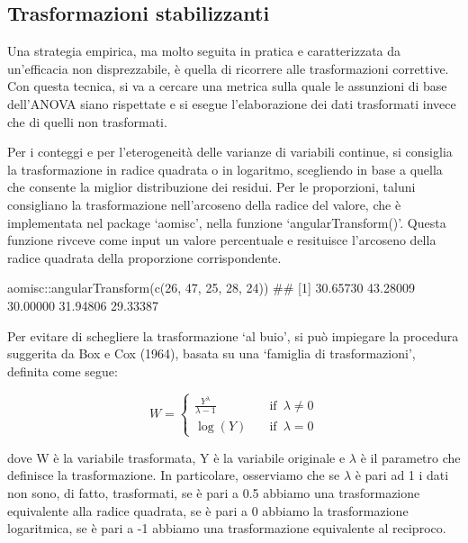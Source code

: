 \documentclass[a4paper,12pt,oneside]{book}
\newenvironment{Shaded}{}{}
\newcommand{\KeywordTok}[1]{#1}
\newcommand{\DecValTok}[1]{#1}
\newcommand{\CommentTok}[1]{#1}
\newcommand{\OperatorTok}[1]{#1}
\newcommand{\NormalTok}[1]{#1}
\begin{document}
\hypertarget{trasformazioni-stabilizzanti}{%
\subsection{Trasformazioni stabilizzanti}\label{trasformazioni-stabilizzanti}}

Una strategia empirica, ma molto seguita in pratica e caratterizzata da un'efficacia non disprezzabile, è quella di ricorrere alle trasformazioni correttive. Con questa tecnica, si va a cercare una metrica sulla quale le assunzioni di base dell'ANOVA siano rispettate e si esegue l'elaborazione dei dati trasformati invece che di quelli non trasformati.

Per i conteggi e per l'eterogeneità delle varianze di variabili continue, si consiglia la trasformazione in radice quadrata o in logaritmo, scegliendo in base a quella che consente la miglior distribuzione dei residui. Per le proporzioni, taluni consigliano la trasformazione nell'arcoseno della radice del valore, che è implementata nel package `aomisc', nella funzione `angularTransform()'. Questa funzione rivceve come input un valore percentuale e resituisce l'arcoseno della radice quadrata della proporzione corrispondente.

\begin{Shaded}
\begin{Highlighting}[]
\NormalTok{aomisc}\OperatorTok{::}\KeywordTok{angularTransform}\NormalTok{(}\KeywordTok{c}\NormalTok{(}\DecValTok{26}\NormalTok{, }\DecValTok{47}\NormalTok{, }\DecValTok{25}\NormalTok{, }\DecValTok{28}\NormalTok{, }\DecValTok{24}\NormalTok{))}
\CommentTok{## [1] 30.65730 43.28009 30.00000 31.94806 29.33387}
\end{Highlighting}
\end{Shaded}

Per evitare di schegliere la trasformazione `al buio', si può impiegare la procedura suggerita da Box e Cox (1964), basata su una `famiglia di trasformazioni', definita come segue:

\[ W = \left\{ \begin{array}{ll}
\frac{Y^\lambda}{\lambda - 1} & \quad \textrm{if} \,\,\, \lambda \neq 0 \\
\log(Y) & \quad \textrm{if} \,\,\, \lambda = 0
\end{array} \right. \]

dove W è la variabile trasformata, Y è la variabile originale e \(\lambda\) è il parametro che definisce la trasformazione. In particolare, osserviamo che se \(\lambda\) è pari ad 1 i dati non sono, di fatto, trasformati, se è pari a 0.5 abbiamo una trasformazione equivalente alla radice quadrata, se è pari a 0 abbiamo la trasformazione logaritmica, se è pari a -1 abbiamo una trasformazione equivalente al reciproco.
\end{document}
